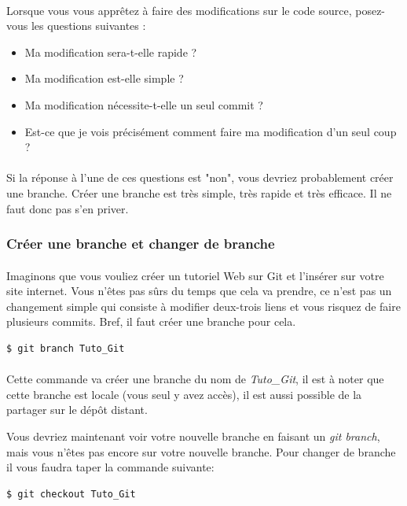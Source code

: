 \documentclass[french, a4paper, 12pt, titlepage]{article}
\begin{document}
\paragraph{}Lorsque vous vous apprêtez à faire des modifications sur le code source, posez-vous les questions suivantes :
\begin{itemize}
\item Ma modification sera-t-elle rapide ?
\item Ma modification est-elle simple ?
\item Ma modification nécessite-t-elle un seul commit ?
\item Est-ce que je vois précisément comment faire ma modification d’un seul coup ?
\end{itemize}

\paragraph{}Si la réponse à l’une de ces questions est "non", vous devriez probablement créer une branche. Créer une branche est très simple, très rapide et très efficace. Il ne faut donc pas s’en priver.

\subsubsection{Créer une branche et changer de branche}
\paragraph{}Imaginons que vous vouliez créer un tutoriel Web sur Git et l'insérer sur votre site internet. Vous n’êtes pas sûrs du temps que cela va prendre, ce n’est pas un changement simple qui consiste à modifier deux-trois liens et vous risquez de faire plusieurs commits. Bref, il faut créer une branche pour cela.
\begin{lstlisting}
$ git branch Tuto_Git
\end{lstlisting}

\paragraph{}Cette commande va créer une branche du nom de \emph{Tuto\_Git}, il est à noter que cette branche est locale (vous seul y avez accès), il est aussi possible de la partager sur le dépôt distant.

Vous devriez maintenant voir votre nouvelle branche en faisant un \emph{git branch}, mais vous n'êtes pas encore sur votre nouvelle branche. Pour changer de branche il vous faudra taper la commande suivante:
\begin{lstlisting}
$ git checkout Tuto_Git
\end{lstlisting}
\end{document}
